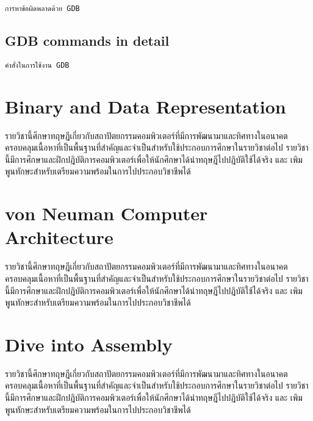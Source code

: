 \documentclass[
  notoc %
]{tufte-book}
\begin{document}
\begin{lstlisting}
การหาข้อผิดพลาดด้วย GDB
\end{lstlisting}

\hypertarget{sec:GDB-commands}{%
\section{GDB commands in detail}\label{sec:GDB-commands}}

\begin{lstlisting}
คำสั่งในการใช้งาน GDB
\end{lstlisting}

\hypertarget{sec:bidatarep}{%
\chapter{Binary and Data Representation}\label{sec:bidatarep}}

รายวิชานี้ศึกษาทฤษฎีเกี่ยวกับสถาปัตยกรรมคอมพิวเตอร์ที่มีการพัฒนามาและทิศทางในอนาคต
ครอบคลุมเนื้อหาที่เป็นพื้นฐานที่สำคัญและจำเป็นสำหรับใช้ประกอบการศึกษาในรายวิชาต่อไป
รายวิชานี้มีการศึกษาและฝึกปฎิบัติการคอมพิวเตอร์เพื่อให้นักศึกษาได้นำทฤษฎีไปปฎิบัติใช้ได้จริง และ
เพิมพูนทักษะสำหรับเตรียมความพร้อมในการไปประกอบวิชาชีพได้

\hypertarget{sec:neumancomparch}{%
\chapter{von Neuman Computer Architecture}\label{sec:neumancomparch}}

รายวิชานี้ศึกษาทฤษฎีเกี่ยวกับสถาปัตยกรรมคอมพิวเตอร์ที่มีการพัฒนามาและทิศทางในอนาคต
ครอบคลุมเนื้อหาที่เป็นพื้นฐานที่สำคัญและจำเป็นสำหรับใช้ประกอบการศึกษาในรายวิชาต่อไป
รายวิชานี้มีการศึกษาและฝึกปฎิบัติการคอมพิวเตอร์เพื่อให้นักศึกษาได้นำทฤษฎีไปปฎิบัติใช้ได้จริง และ
เพิมพูนทักษะสำหรับเตรียมความพร้อมในการไปประกอบวิชาชีพได้

\hypertarget{sec:diveintoassembly}{%
\chapter{Dive into Assembly}\label{sec:diveintoassembly}}

รายวิชานี้ศึกษาทฤษฎีเกี่ยวกับสถาปัตยกรรมคอมพิวเตอร์ที่มีการพัฒนามาและทิศทางในอนาคต
ครอบคลุมเนื้อหาที่เป็นพื้นฐานที่สำคัญและจำเป็นสำหรับใช้ประกอบการศึกษาในรายวิชาต่อไป
รายวิชานี้มีการศึกษาและฝึกปฎิบัติการคอมพิวเตอร์เพื่อให้นักศึกษาได้นำทฤษฎีไปปฎิบัติใช้ได้จริง และ
เพิมพูนทักษะสำหรับเตรียมความพร้อมในการไปประกอบวิชาชีพได้
\end{document}
